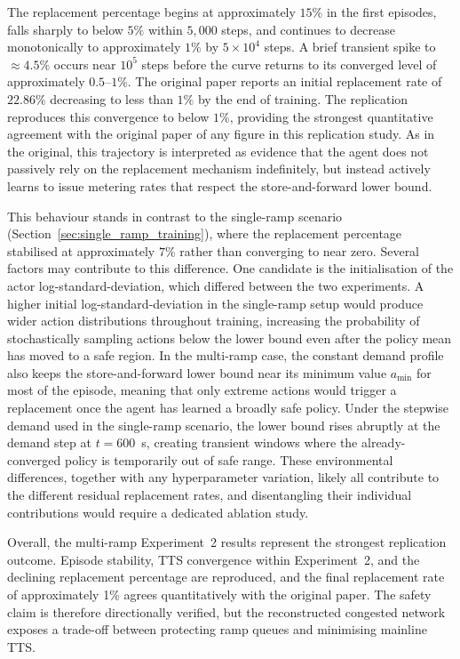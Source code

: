The replacement percentage begins at approximately $15\%$ in the first episodes, falls sharply to below $5\%$ within $5{,}000$ steps, and continues to decrease monotonically to approximately $1\%$ by $5 \times 10^4$ steps. A brief transient spike to $\approx 4.5\%$ occurs near $10^5$ steps before the curve returns to its converged level of approximately $0.5$--$1\%$. The original paper reports an initial replacement rate of $22.86\%$ decreasing to less than $1\%$ by the end of training. The replication reproduces this convergence to below $1\%$, providing the strongest quantitative agreement with the original paper of any figure in this replication study. As in the original, this trajectory is interpreted as evidence that the agent does not passively rely on the replacement mechanism indefinitely, but instead actively learns to issue metering rates that respect the store-and-forward lower bound.

This behaviour stands in contrast to the single-ramp scenario (Section~\ref{sec:single_ramp_training}), where the replacement percentage stabilised at approximately $7\%$ rather than converging to near zero. Several factors may contribute to this difference. One candidate is the initialisation of the actor log-standard-deviation, which differed between the two experiments. A higher initial log-standard-deviation in the single-ramp setup would produce wider action distributions throughout training, increasing the probability of stochastically sampling actions below the lower bound even after the policy mean has moved to a safe region. In the multi-ramp case, the constant demand profile also keeps the store-and-forward lower bound near its minimum value $a_{\min}$ for most of the episode, meaning that only extreme actions would trigger a replacement once the agent has learned a broadly safe policy. Under the stepwise demand used in the single-ramp scenario, the lower bound rises abruptly at the demand step at $t = 600$~s, creating transient windows where the already-converged policy is temporarily out of safe range. These environmental differences, together with any hyperparameter variation, likely all contribute to the different residual replacement rates, and disentangling their individual contributions would require a dedicated ablation study.

Overall, the multi-ramp Experiment~2 results represent the strongest replication outcome. Episode stability, TTS convergence within Experiment~2, and the declining replacement percentage are reproduced, and the final replacement rate of approximately 1\% agrees quantitatively with the original paper. The safety claim is therefore directionally verified, but the reconstructed congested network exposes a trade-off between protecting ramp queues and minimising mainline TTS.

